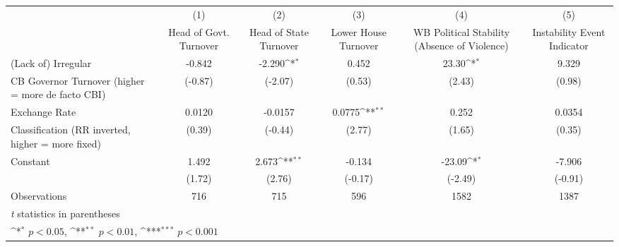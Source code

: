 {
\def\sym#1{\ifmmode^{#1}\else\(^{#1}\)\fi}
\begin{tabular}{l*{5}{c}}
\hline\hline
                    &\multicolumn{1}{c}{(1)}&\multicolumn{1}{c}{(2)}&\multicolumn{1}{c}{(3)}&\multicolumn{1}{c}{(4)}&\multicolumn{1}{c}{(5)}\\
                    &\multicolumn{1}{c}{Head of Govt. Turnover}&\multicolumn{1}{c}{Head of State Turnover}&\multicolumn{1}{c}{Lower House Turnover}&\multicolumn{1}{c}{WB Political Stability (Absence of Violence)}&\multicolumn{1}{c}{Instability Event Indicator}\\
\hline
(Lack of) Irregular &      -0.842         &      -2.290\sym{*}  &       0.452         &       23.30\sym{*}  &       9.329         \\
CB Governor Turnover (higher = more de facto CBI)&     (-0.87)         &     (-2.07)         &      (0.53)         &      (2.43)         &      (0.98)         \\
[1em]
Exchange Rate       &      0.0120         &     -0.0157         &      0.0775\sym{**} &       0.252         &      0.0354         \\
Classification (RR inverted, higher = more fixed)&      (0.39)         &     (-0.44)         &      (2.77)         &      (1.65)         &      (0.35)         \\
[1em]
Constant            &       1.492         &       2.673\sym{**} &      -0.134         &      -23.09\sym{*}  &      -7.906         \\
                    &      (1.72)         &      (2.76)         &     (-0.17)         &     (-2.49)         &     (-0.91)         \\
\hline
Observations        &         716         &         715         &         596         &        1582         &        1387         \\
\hline\hline
\multicolumn{6}{l}{\footnotesize \textit{t} statistics in parentheses}\\
\multicolumn{6}{l}{\footnotesize \sym{*} \(p<0.05\), \sym{**} \(p<0.01\), \sym{***} \(p<0.001\)}\\
\end{tabular}
}
